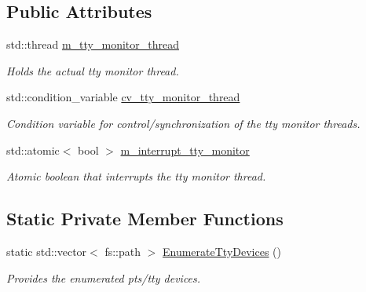 \subsection*{Public Attributes}
\begin{DoxyCompactItemize}
\item 
\mbox{\label{classEventDetect_1_1TtyMonitor_a33d166bea609b24b35551d8ba1030b69}} 
std\+::thread \mbox{\hyperlink{classEventDetect_1_1TtyMonitor_a33d166bea609b24b35551d8ba1030b69}{m\+\_\+tty\+\_\+monitor\+\_\+thread}}
\begin{DoxyCompactList}\small\item\em Holds the actual tty monitor thread. \end{DoxyCompactList}\item 
\mbox{\label{classEventDetect_1_1TtyMonitor_a64f88801024f9d55be77dd62cfa35cd7}} 
std\+::condition\+\_\+variable \mbox{\hyperlink{classEventDetect_1_1TtyMonitor_a64f88801024f9d55be77dd62cfa35cd7}{cv\+\_\+tty\+\_\+monitor\+\_\+thread}}
\begin{DoxyCompactList}\small\item\em Condition variable for control/synchronization of the tty monitor threads. \end{DoxyCompactList}\item 
\mbox{\label{classEventDetect_1_1TtyMonitor_af0525ecc811f972155b3c4c1a1b44b84}} 
std\+::atomic$<$ bool $>$ \mbox{\hyperlink{classEventDetect_1_1TtyMonitor_af0525ecc811f972155b3c4c1a1b44b84}{m\+\_\+interrupt\+\_\+tty\+\_\+monitor}}
\begin{DoxyCompactList}\small\item\em Atomic boolean that interrupts the tty monitor thread. \end{DoxyCompactList}\end{DoxyCompactItemize}
\subsection*{Static Private Member Functions}
\begin{DoxyCompactItemize}
\item 
static std\+::vector$<$ fs\+::path $>$ \mbox{\hyperlink{classEventDetect_1_1TtyMonitor_ab0a2e0d72dba323fad08077825432da0}{Enumerate\+Tty\+Devices}} ()
\begin{DoxyCompactList}\small\item\em Provides the enumerated pts/tty devices. \end{DoxyCompactList}\end{DoxyCompactItemize}
